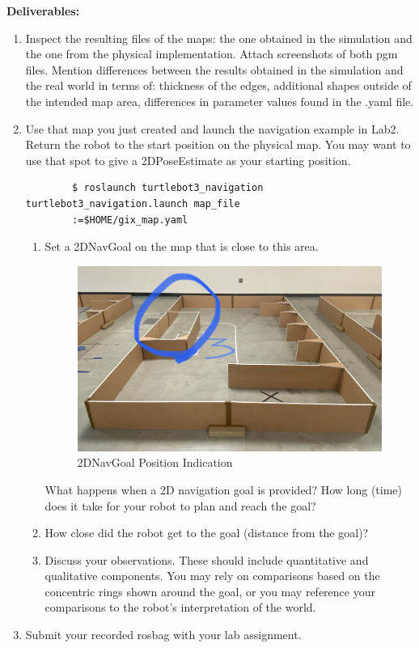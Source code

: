 \documentclass[12pt]{article}
\begin{document}
\textbf{Deliverables:}
\begin{enumerate}
    \item Inspect the resulting files of the maps: the one obtained in the simulation and the one from the physical implementation. Attach screenshots of both pgm files. Mention differences between the results obtained in the simulation and the real world in terms of: thickness of the edges, additional shapes outside of the intended map area, differences in parameter values found in the .yaml file.
    
    \item Use that map you just created and launch the navigation example in Lab2. Return the robot to the start position on the physical map. You may want to use that spot to give a 2DPoseEstimate as your starting position.
    \begin{verbatim}
        $ roslaunch turtlebot3_navigation turtlebot3_navigation.launch map_file
        :=$HOME/gix_map.yaml
    \end{verbatim}
    \begin{enumerate}
        \item Set a 2DNavGoal on the map that is close to this area.
        \begin{figure}[H]
        \vspace{-10pt}
        \centering\includegraphics[width=14cm]{images/map2.jpeg}\vspace{-10pt}
        \caption{2DNavGoal Position Indication}
        \end{figure}
        
        What happens when a 2D navigation goal is provided? How long (time) does it take for your robot to plan and reach the goal? 
        \item How close did the robot get to the goal (distance from the goal)?
        \item Discuss your observations. These should include quantitative and qualitative components. You may rely on comparisons based on the concentric rings shown around the goal, or you may reference your comparisons to the robot’s interpretation of the world.
    \end{enumerate}
    \item Submit your recorded rosbag with your lab assignment.
    
    
\end{enumerate}
\end{document}
